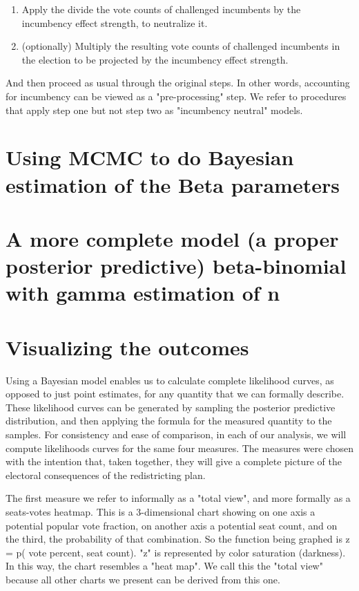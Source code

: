 \documentclass[preprint,12pt]{article}
\begin{document}
\begin{enumerate}
\item Apply the divide the vote counts of challenged incumbents by the incumbency effect strength, to neutralize it.
\item (optionally) Multiply the resulting vote counts of challenged incumbents in the election to be projected by the incumbency effect strength.
\end{enumerate}

And then proceed as usual through the original steps.  In other words, accounting for incumbency can be viewed as a "pre-processing" step.  We refer to procedures that apply step one but not step two as "incumbency neutral" models.

\section{Using MCMC to do Bayesian estimation of the Beta parameters}

\section{A more complete model (a proper posterior predictive) beta-binomial with gamma estimation of n}

\section{Visualizing the outcomes}

Using a Bayesian model enables us to calculate complete likelihood curves, as opposed to just point estimates, for any quantity that we can formally describe.  These likelihood curves can be generated by sampling the posterior predictive distribution, and then applying the formula for the measured quantity to the samples.  For consistency and ease of comparison, in each of our analysis, we will compute likelihoods curves for the same four measures.  The measures were chosen with the intention that, taken together, they will give a complete picture of the electoral consequences of the redistricting plan.



The first measure we refer to informally as a "total view", and more formally as a seats-votes heatmap. This is a 3-dimensional chart showing on one axis a potential popular vote fraction, on another axis a potential seat count, and on the third, the probability of that combination.  So the function being graphed is z = p( vote percent, seat count). "z" is represented by color saturation (darkness).  In this way, the chart resembles a "heat map". We call this the "total view" because all other charts we present can be derived from this one.
\end{document}
